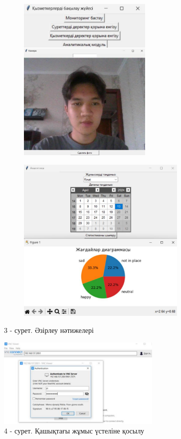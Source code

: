 \begin{figure}[H]
	\centering
	\begin{subfigure}{0.48\textwidth}
		\centering
		\includegraphics[height=8cm]{media/ict2/image161}
	\end{subfigure}
	\begin{subfigure}{0.48\textwidth}
		\centering
		\includegraphics[height=8cm]{media/ict2/image162}
	\end{subfigure}
    \caption*{3 - сурет. Әзірлеу нәтижелері}
\end{figure}

\begin{figure}[H]
	\centering
	\includegraphics[width=0.7\textwidth]{media/ict2/image163}
	\caption*{4 - сурет. Қашықтағы жұмыс үстеліне қосылу}
\end{figure}


